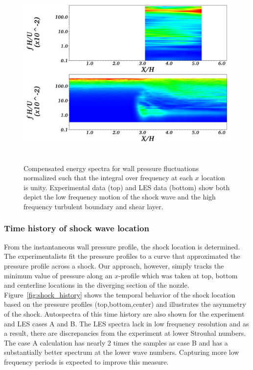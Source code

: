 \documentclass[]{aiaa-tc}%
\begin{document}
\begin{figure}[!h]
	\begin{centering}
	\includegraphics[height=3.75in]{../../figs/XvSt_wall.jpg}
	\caption{ Compensated energy spectra for wall pressure fluctuations normalized such that the integral over frequency at each $x$ location is unity.  Experimental data (top) and LES data (bottom) show both depict the low frequency motion of the shock wave and the high frequency turbulent boundary and shear layer.
 	\label{fig:comp_spectra}
	}
	\end{centering}
\end{figure}



\subsubsection{Time history of shock wave location }

From the instantaneous wall pressure profile, the shock location is determined.  The experimentalists fit the pressure profiles to a curve that approximated the pressure profile across a shock.  Our approach, however, simply tracks the minimum value of pressure along an $x$-profile which was taken at top, bottom and centerline locations in the diverging section of the nozzle.  Figure~\ref{fig:shock_history} shows the temporal behavior of the shock location based on the pressure profiles (top,bottom,center) and illustrates the asymmetry of the shock.  Autospectra of this time history are also shown for the experiment and LES cases A and B.  The LES spectra lack in low frequency resolution and as a result, there are discrepancies from the experiment at lower Strouhal numbers.  The case A calculation has nearly 2 times the samples as case B and has a substantially better spectrum at the lower wave numbers.  Capturing more low frequency periods is expected to improve this measure.  
\end{document}
